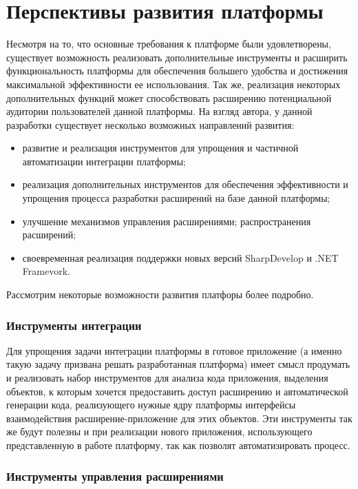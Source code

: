 \section{Перспективы развития платформы}

Несмотря на то, что основные требования к платформе были удовлетворены, существует возможность реализовать дополнительные инструменты и расширить функциональность платформы для обеспечения большего удобства и достижения максимальной эффективности ее использования. Так же, реализация некоторых дополнительных функций может способствовать расширению потенциальной аудитории пользователей данной платформы. На взгляд автора, у данной разработки существует несколько возможных направлений развития:

\begin{itemize}
   \item развитие и реализация инструментов для упрощения и частичной автоматизации интеграции платформы;
   \item реализация дополнительных инструментов для обеспечения эффективности и упрощения процесса разработки расширений на базе данной платформы;
   \item улучшение механизмов управления расширениями; распространения расширений;
   \item своевременная реализация поддержки новых версий SharpDevelop и .NET Framevork.
\end{itemize}

Рассмотрим некоторые возможности развития платфоры более подробно.

\subsubsection{Инструменты интеграции}

Для упрощения задачи интеграции платформы в готовое приложение (а именно такую задачу призвана решать разработанная платформа) имеет смысл продумать и реализовать набор инструментов для анализа кода приложения, выделения объектов, к которым хочется предоставить доступ расширению и автоматической генерации кода, реализующего нужные ядру платформы интерфейсы взаимодействия расширение-приложение для этих объектов. Эти инструменты так же будут полезны и при реализации нового приложения, использующего представленную в работе платформу, так как позволят автоматизировать процесс.

\subsubsection{Инструменты управления расширениями}

